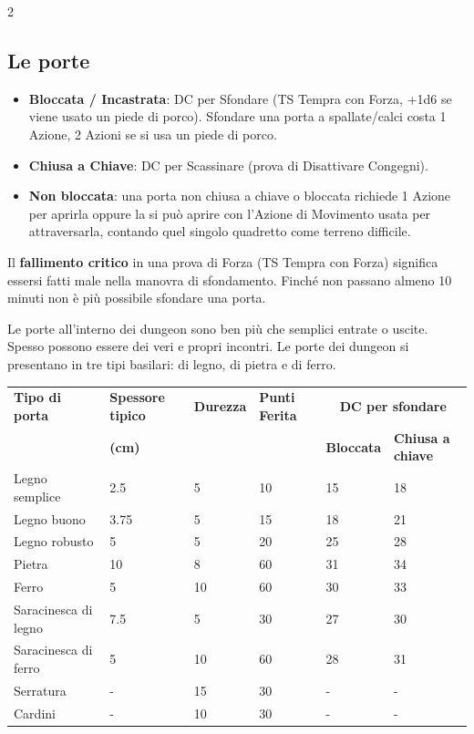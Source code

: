 \begin{multicols}{2}
\subsection{Le porte}

\noindent\begin{itemize}[leftmargin=*] \setlength{\itemsep}{0pt}
\item \textbf{Bloccata / Incastrata}: DC per Sfondare (TS Tempra con Forza, +1d6 se viene usato un piede di porco). Sfondare una porta a spallate/calci costa 1 Azione, 2 Azioni se si usa un piede di porco.
\item \textbf{Chiusa a Chiave}: DC per Scassinare (prova di Disattivare Congegni).
\item \textbf{Non bloccata}: una porta non chiusa a chiave o bloccata richiede 1 Azione per aprirla oppure la si può aprire con l'Azione di Movimento usata per attraversarla, contando quel singolo quadretto come terreno difficile.
\end{itemize}

\medskip

Il \textbf{fallimento critico} in una prova di Forza (TS Tempra con Forza) significa essersi fatti male nella manovra di sfondamento. Finché non passano almeno 10 minuti non è più possibile sfondare una porta.

Le porte all'interno dei dungeon sono ben più che semplici entrate o uscite. Spesso possono essere dei veri e propri incontri. Le porte dei dungeon si presentano in tre tipi basilari: di legno, di pietra e di ferro.

\end{multicols}

\label{tabellaporte}\hypertarget{tabellaporte}{}

\medskip

\noindent\begin{tabular}{llllll}
	\toprule
\rowcolor{gray!20}\textbf{Tipo di porta} & \textbf{Spessore tipico} & \textbf{Durezza} & \textbf{Punti Ferita} & \multicolumn{2}{c}{\textbf{DC per sfondare}} \\
&\textbf{(cm)}&&& \textbf{Bloccata} & \textbf{Chiusa a chiave}\\
\toprule
Legno semplice & 2.5& 5 & 10& 15 & 18\\
\rowcolor{gray!20}Legno buono& 3.75 & 5 & 15& 18 & 21\\
Legno robusto& 5& 5 & 20& 25 & 28\\
\rowcolor{gray!20}Pietra& 10 & 8 & 60& 31 & 34\\
Ferro & 5& 10& 60& 30 & 33\\
\rowcolor{gray!20}Saracinesca di legno & 7.5& 5 & 30& 27& 30\\
Saracinesca di ferro & 5& 10& 60& 28& 31\\
\rowcolor{gray!20}Serratura& -& 15& 30& -& -\\
Cardini & -& 10& 30& -& -
\end{tabular}

